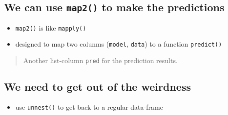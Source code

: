 \documentclass[]{book}
\newenvironment{Shaded}{\begin{snugshade}}{\end{snugshade}}
\newcommand{\CommentTok}[1]{\textcolor[rgb]{0.56,0.35,0.01}{\textit{#1}}}
\newcommand{\DataTypeTok}[1]{\textcolor[rgb]{0.13,0.29,0.53}{#1}}
\newcommand{\KeywordTok}[1]{\textcolor[rgb]{0.13,0.29,0.53}{\textbf{#1}}}
\newcommand{\NormalTok}[1]{#1}
\newcommand{\OperatorTok}[1]{\textcolor[rgb]{0.81,0.36,0.00}{\textbf{#1}}}
\newcommand{\StringTok}[1]{\textcolor[rgb]{0.31,0.60,0.02}{#1}}
\providecommand{\tightlist}{%
  \setlength{\itemsep}{0pt}\setlength{\parskip}{0pt}}
\begin{document}
\hypertarget{we-can-use-map2-to-make-the-predictions}{%
\subsection{\texorpdfstring{We can use \texttt{map2()} to make the predictions}{We can use map2() to make the predictions}}\label{we-can-use-map2-to-make-the-predictions}}

\begin{itemize}
\item
  \texttt{map2()} is like \texttt{mapply()}
\item
  designed to map two colunms (\texttt{model}, \texttt{data}) to a function \texttt{predict()}
\end{itemize}

\begin{Shaded}
\end{Shaded}

\begin{quote}
Another list-column \texttt{pred} for the prediction results.
\end{quote}

\hypertarget{we-need-to-get-out-of-the-weirdness}{%
\subsection{We need to get out of the weirdness}\label{we-need-to-get-out-of-the-weirdness}}

\begin{itemize}
\tightlist
\item
  use \texttt{unnest()} to get back to a regular data-frame
\end{itemize}
\end{document}
